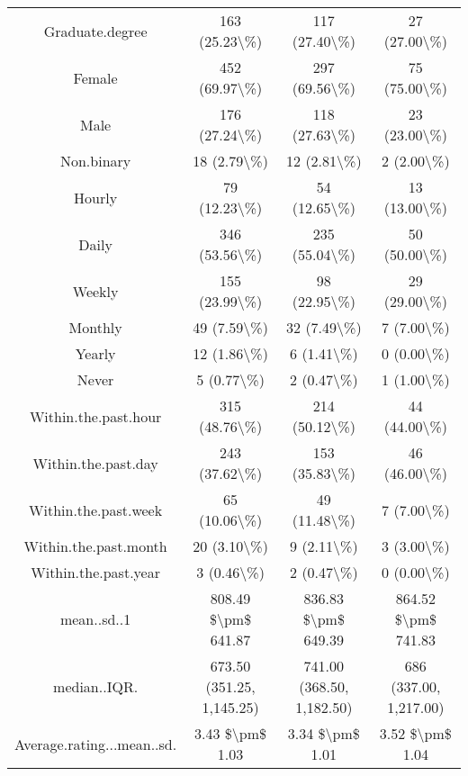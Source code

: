 \begin{table}[!htbp]
\begin{tabular}{@{\extracolsep{5pt}} cccc}
Graduate.degree & 163 (25.23\textbackslash \%) & 117 (27.40\textbackslash \%) & 27 (27.00\textbackslash \%) \\ 
Female & 452 (69.97\textbackslash \%) & 297 (69.56\textbackslash \%) & 75 (75.00\textbackslash \%) \\ 
Male & 176 (27.24\textbackslash \%) & 118 (27.63\textbackslash \%) & 23 (23.00\textbackslash \%) \\ 
Non.binary & 18 (2.79\textbackslash \%) & 12 (2.81\textbackslash \%) & 2 (2.00\textbackslash \%) \\ 
Hourly & 79 (12.23\textbackslash \%) & 54 (12.65\textbackslash \%) & 13 (13.00\textbackslash \%) \\ 
Daily & 346 (53.56\textbackslash \%) & 235 (55.04\textbackslash \%) & 50 (50.00\textbackslash \%) \\ 
Weekly & 155 (23.99\textbackslash \%) & 98 (22.95\textbackslash \%) & 29 (29.00\textbackslash \%) \\ 
Monthly & 49 (7.59\textbackslash \%) & 32 (7.49\textbackslash \%) & 7 (7.00\textbackslash \%) \\ 
Yearly & 12 (1.86\textbackslash \%) & 6 (1.41\textbackslash \%) & 0 (0.00\textbackslash \%) \\ 
Never & 5 (0.77\textbackslash \%) & 2 (0.47\textbackslash \%) & 1 (1.00\textbackslash \%) \\ 
Within.the.past.hour & 315 (48.76\textbackslash \%) & 214 (50.12\textbackslash \%) & 44 (44.00\textbackslash \%) \\ 
Within.the.past.day & 243 (37.62\textbackslash \%) & 153 (35.83\textbackslash \%) & 46 (46.00\textbackslash \%) \\ 
Within.the.past.week & 65 (10.06\textbackslash \%) & 49 (11.48\textbackslash \%) & 7 (7.00\textbackslash \%) \\ 
Within.the.past.month & 20 (3.10\textbackslash \%) & 9 (2.11\textbackslash \%) & 3 (3.00\textbackslash \%) \\ 
Within.the.past.year & 3 (0.46\textbackslash \%) & 2 (0.47\textbackslash \%) & 0 (0.00\textbackslash \%) \\ 
mean..sd..1 & 808.49 \$\textbackslash pm\$ 641.87 & 836.83 \$\textbackslash pm\$ 649.39 & 864.52 \$\textbackslash pm\$ 741.83 \\ 
median..IQR. & 673.50 (351.25, 1,145.25) & 741.00 (368.50, 1,182.50) & 686 (337.00, 1,217.00) \\ 
Average.rating...mean..sd. & 3.43 \$\textbackslash pm\$ 1.03 & 3.34 \$\textbackslash pm\$ 1.01 & 3.52 \$\textbackslash pm\$ 1.04 \\ 

\end{tabular}
\end{table}
